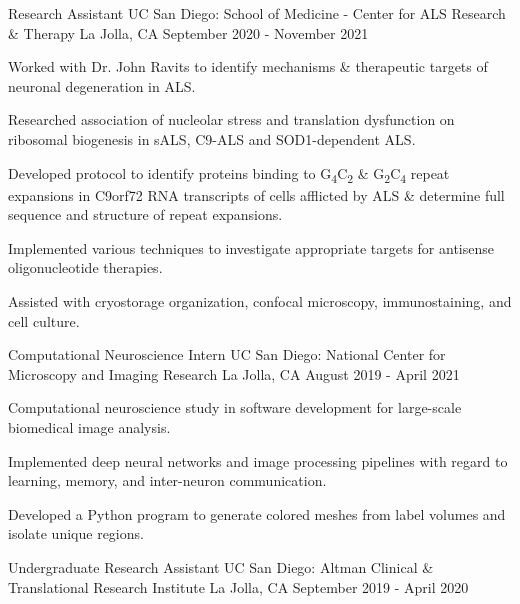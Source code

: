 \begin{cventries}
\cventry
{Research Assistant} %
{UC San Diego: School of Medicine - Center for ALS Research \& Therapy} %
{La Jolla, CA} %
{September 2020 - November 2021} %
{
  \begin{cvitems} %
    \item {Worked with Dr. John Ravits to identify mechanisms \& therapeutic targets of neuronal degeneration in ALS.}
    \item {Researched association of nucleolar stress and translation dysfunction on ribosomal biogenesis in sALS, C9-ALS and SOD1-dependent ALS.}
    \item {Developed protocol to identify proteins binding to G\textsubscript{4}C\textsubscript{2} \& G\textsubscript{2}C\textsubscript{4} repeat expansions in C9orf72 RNA transcripts of cells afflicted by ALS \& determine full sequence and structure of repeat expansions.}
    \item {Implemented various techniques to investigate appropriate targets for antisense oligonucleotide therapies.}
    \item {Assisted with cryostorage organization, confocal microscopy, immunostaining, and cell culture.}
  \end{cvitems}
}
\cventry
{Computational Neuroscience Intern} %
{UC San Diego: National Center for Microscopy and Imaging Research} %
{La Jolla, CA} %
{August 2019 - April 2021} %
{
  \begin{cvitems} %
    \item {Computational neuroscience study in software development for large-scale biomedical image analysis.}
    \item {Implemented deep neural networks and image processing pipelines with regard to learning, memory, and inter-neuron communication.}
    \item {Developed a Python program to generate colored meshes from label volumes and isolate unique regions.}
  \end{cvitems}
}
  \cventry
    {Undergraduate Research Assistant} %
    {UC San Diego: Altman Clinical \& Translational Research Institute} %
    {La Jolla, CA} %
    {September 2019 - April 2020} %

\end{cventries}
